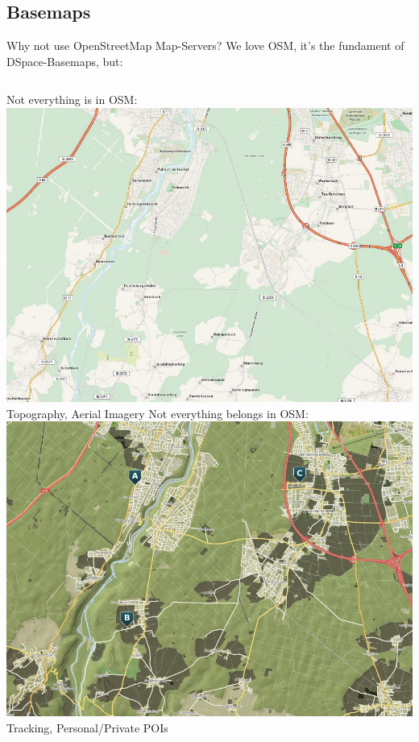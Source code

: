 \documentclass{beamer}
\begin{document}
\subsection{Basemaps}

\begin{frame}{Why not use OpenStreetMap Map-Servers?}
 {\small We love OSM, it's the fundament of DSpace-Basemaps, but: }
 \linebreak
 \begin{columns}
   {\small Not everything is in OSM:\vspace{1em}}
   \includegraphics[scale=0.169]{images/map_render_osm}
   \linebreak
   {\small Topography, Aerial Imagery}
   {\small Not everything belongs in OSM:\vspace{1em}}
   \includegraphics[scale=0.169]{images/map_render_dspace}
   \linebreak
   {\small Tracking, Personal/Private POIs}
 \end{columns}
\end{frame}
\end{document}

